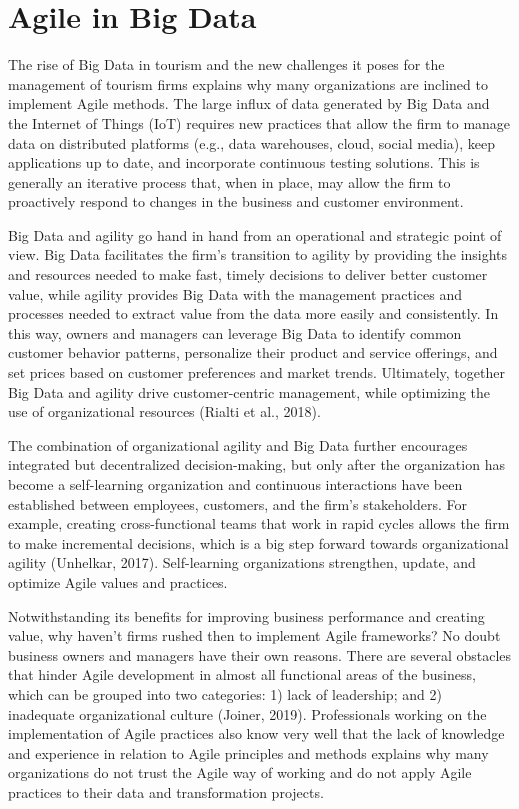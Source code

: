 \documentclass[
  letterpaper,
  DIV=11,
  numbers=noendperiod]{scrreprt}
\begin{document}
\hypertarget{agile-in-big-data}{%
\section{Agile in Big Data}\label{agile-in-big-data}}

The rise of Big Data in tourism and the new challenges it poses for the
management of tourism firms explains why many organizations are inclined
to implement Agile methods. The large influx of data generated by Big
Data and the Internet of Things (IoT) requires new practices that allow
the firm to manage data on distributed platforms (e.g., data warehouses,
cloud, social media), keep applications up to date, and incorporate
continuous testing solutions. This is generally an iterative process
that, when in place, may allow the firm to proactively respond to
changes in the business and customer environment.

Big Data and agility go hand in hand from an operational and strategic
point of view. Big Data facilitates the firm's transition to agility by
providing the insights and resources needed to make fast, timely
decisions to deliver better customer value, while agility provides Big
Data with the management practices and processes needed to extract value
from the data more easily and consistently. In this way, owners and
managers can leverage Big Data to identify common customer behavior
patterns, personalize their product and service offerings, and set
prices based on customer preferences and market trends. Ultimately,
together Big Data and agility drive customer-centric management, while
optimizing the use of organizational resources (Rialti et al., 2018).

The combination of organizational agility and Big Data further
encourages integrated but decentralized decision-making, but only after
the organization has become a self-learning organization and continuous
interactions have been established between employees, customers, and the
firm's stakeholders. For example, creating cross-functional teams that
work in rapid cycles allows the firm to make incremental decisions,
which is a big step forward towards organizational agility (Unhelkar,
2017). Self-learning organizations strengthen, update, and optimize
Agile values and practices.

Notwithstanding its benefits for improving business performance and
creating value, why haven't firms rushed then to implement Agile
frameworks? No doubt business owners and managers have their own
reasons. There are several obstacles that hinder Agile development in
almost all functional areas of the business, which can be grouped into
two categories: 1) lack of leadership; and 2) inadequate organizational
culture (Joiner, 2019). Professionals working on the implementation of
Agile practices also know very well that the lack of knowledge and
experience in relation to Agile principles and methods explains why many
organizations do not trust the Agile way of working and do not apply
Agile practices to their data and transformation projects.
\end{document}
